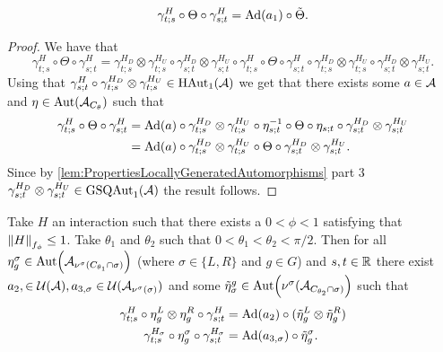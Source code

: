 \documentclass[11pt,a4paper,twoside]{article}
\numberwithin{equation}{section}
\begin{document}
{\begin{lemma}
		\begin{equation}\label{eq:TwoAngleLemmaPart1Equation1}
			\gamma^{H}_{t;s}\circ\Theta\circ\gamma^{H}_{s;t}=\Ad{a_1}\circ\tilde{\Theta}.
		\end{equation}
	\end{lemma}
	\begin{proof}
		We have that
		\begin{equation}
			\gamma^{H}_{t;s}\circ\Theta\circ\gamma^{H}_{s;t}=\gamma^{H_D}_{t;s}\otimes\gamma^{H_U}_{t;s}\circ\gamma^{H_D}_{s;t}\otimes\gamma^{H_U}_{s;t}\circ\gamma^{H}_{t;s}\circ\Theta\circ\gamma^{H}_{s;t}\circ\gamma^{H_D}_{t;s}\otimes\gamma^{H_U}_{t;s}\circ\gamma^{H_D}_{s;t}\otimes\gamma^{H_U}_{s;t}.
		\end{equation}
		Using that $\gamma^{H}_{s;t}\circ\gamma^{H_D}_{t;s}\otimes\gamma^{H_U}_{t;s}\in\textrm{HAut}_1(\AA)$ we get that there exists some $a\in\AA$ and $\eta\in\Aut{\AA_{C_\theta}}$ such that
		\begin{align}
			\gamma^{H}_{t;s}\circ\Theta\circ\gamma^{H}_{s;t}&=\Ad{a}\circ \gamma^{H_D}_{t;s}\otimes\gamma^{H_U}_{t;s}\circ\eta_{s;t}^{-1}\circ\Theta\circ\eta_{s;t}\circ\gamma^{H_D}_{s;t}\otimes\gamma^{H_U}_{s;t}\\
			&=\Ad{a}\circ \gamma^{H_D}_{t;s}\otimes\gamma^{H_U}_{t;s}\circ\Theta\circ\gamma^{H_D}_{s;t}\otimes\gamma^{H_U}_{s;t}.
		\end{align}
		Since by \ref{lem:PropertiesLocallyGeneratedAutomorphisms} part 3 $\gamma^{H_D}_{s;t}\otimes\gamma^{H_U}_{s;t}\in\textrm{GSQAut}_1(\AA)$ the result follows.
	\end{proof}
	\begin{lemma}\label{lem:TwoAngleLemmaPart2}
		Take $H$ an interaction such that there exists a $0<\phi<1$ satisfying that $\norm{H}_{f_\phi}\leq 1$. Take $\theta_1$ and $\theta_2$ such that $0<\theta_1<\theta_2<\pi/2$. Then for all $\eta_{g}^{\sigma}\in\Aut{\AA_{\nu^{\sigma}(C_{\theta_1}\cap\sigma)}}$ (where $\sigma\in\{L,R\}$ and $g\in G$) and $s,t\in\RR$ there exist $a_{2},\in\UU(\AA),a_{3,\sigma}\in\UU(\AA_{\nu^{\sigma}(\sigma)})$ and some $\tilde{\eta}_{\sigma}^g\in \Aut{\nu^{\sigma}(\AA_{C_{\theta_2}\cap\sigma)}}$ such that
		\begin{align}
			\label{eq:TwoAngleLemmaPart2Equation1}
			\gamma^{H}_{t;s}\circ\eta_{g}^L\otimes\eta_{g}^R\circ\gamma^{H}_{s;t}&=\Ad{a_2}\circ(\tilde\eta_{g}^L \otimes\tilde\eta_{g}^R)\\
			\label{eq:TwoAngleLemmaPart2Equation2}
			\gamma^{H_\sigma}_{t;s}\circ\eta_g^\sigma\circ\gamma^{H_\sigma}_{s;t}&=\Ad{a_{3,\sigma}}\circ \tilde\eta_{g}^\sigma.

\end{align}
\end{lemma}}
\end{document}
